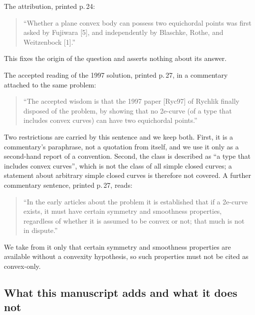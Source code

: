 \documentclass[11pt]{article}
\theoremstyle{definition}
\theoremstyle{remark}
\begin{document}
The attribution, printed p.\,24:
\begin{quote}
``Whether a plane convex body can possess two equichordal points was first asked by Fujiwara [5], and
independently by Blaschke, Rothe, and Weitzenbock [1].'' \cite{klee1960}
\end{quote}
This fixes the origin of the question and asserts nothing about its answer.

The accepted reading of the 1997 solution, printed p.\,27, in a commentary attached to the same problem:
\begin{quote}
``The accepted wisdom is that the 1997 paper [Ryc97] of Rychlik finally disposed of the problem, by showing that
no 2e-curve (of a type that includes convex curves) can have two equichordal points.'' \cite{klee1960}
\end{quote}
Two restrictions are carried by this sentence and we keep both. First, it is a commentary's paraphrase, not a
quotation from \cite{rychlik1997} itself, and we use it only as a second-hand report of a convention. Second,
the class is described as ``a type that includes convex curves'', which is not the class of all simple closed
curves; a statement about arbitrary simple closed curves is therefore not covered. A further commentary
sentence, printed p.\,27, reads:
\begin{quote}
``In the early articles about the problem it is established that if a 2e-curve exists, it must have certain
symmetry and smoothness properties, regardless of whether it is assumed to be convex or not; that much is not
in dispute.'' \cite{klee1960}
\end{quote}
We take from it only that certain symmetry and smoothness properties are available without a convexity
hypothesis, so such properties must not be cited as convex-only.

\subsection{What this manuscript adds and what it does not}
\end{document}
